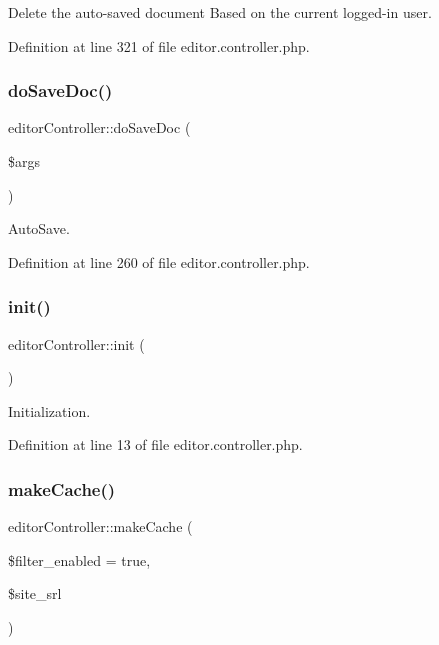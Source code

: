 Delete the auto-\/saved document Based on the current logged-\/in user. 



Definition at line 321 of file editor.\+controller.\+php.

\mbox{\label{classeditorController_a9e5a3fdca13b5ac5c507964fbcd74d35}} 
\subsubsection{\texorpdfstring{do\+Save\+Doc()}{doSaveDoc()}}
{\footnotesize\ttfamily editor\+Controller\+::do\+Save\+Doc (\begin{DoxyParamCaption}\item[{}]{\$args }\end{DoxyParamCaption})}



Auto\+Save. 



Definition at line 260 of file editor.\+controller.\+php.

\mbox{\label{classeditorController_a40838d463bafa5863b5f966b8828738b}} 
\subsubsection{\texorpdfstring{init()}{init()}}
{\footnotesize\ttfamily editor\+Controller\+::init (\begin{DoxyParamCaption}{ }\end{DoxyParamCaption})}



Initialization. 



Definition at line 13 of file editor.\+controller.\+php.

\mbox{\label{classeditorController_a246bf423c2f25208758a5cbcd2ba9890}} 
\subsubsection{\texorpdfstring{make\+Cache()}{makeCache()}}
{\footnotesize\ttfamily editor\+Controller\+::make\+Cache (\begin{DoxyParamCaption}\item[{}]{\$filter\+\_\+enabled = {\ttfamily true},  }\item[{}]{\$site\+\_\+srl }\end{DoxyParamCaption})}



